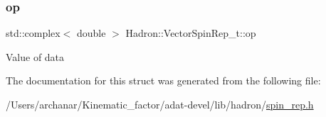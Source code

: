 \subsubsection{\texorpdfstring{op}{op}}
{\footnotesize\ttfamily std\+::complex$<$ double $>$ Hadron\+::\+Vector\+Spin\+Rep\+\_\+t\+::op}

Value of data 

The documentation for this struct was generated from the following file\+:\begin{DoxyCompactItemize}
\item 
/\+Users/archanar/\+Kinematic\+\_\+factor/adat-\/devel/lib/hadron/\mbox{\hyperlink{adat-devel_2lib_2hadron_2spin__rep_8h}{spin\+\_\+rep.\+h}}\end{DoxyCompactItemize}
